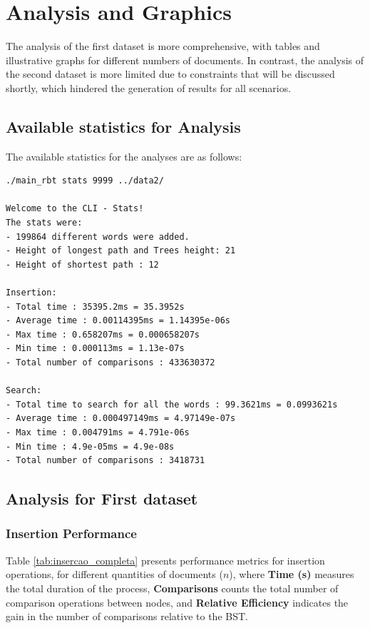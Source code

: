 \section{Analysis and Graphics}

The analysis of the first dataset is more comprehensive, with tables and illustrative graphs for different 
numbers of documents. In contrast, the analysis of the second dataset is more limited due to constraints that 
will be discussed shortly, which hindered the generation of results for all scenarios.

\subsection{Available statistics for Analysis}

The available statistics for the analyses are as follows:

\begin{verbatim}
./main_rbt stats 9999 ../data2/

Welcome to the CLI - Stats!
The stats were: 
- 199864 different words were added.
- Height of longest path and Trees height: 21
- Height of shortest path : 12

Insertion: 
- Total time : 35395.2ms = 35.3952s
- Average time : 0.00114395ms = 1.14395e-06s
- Max time : 0.658207ms = 0.000658207s
- Min time : 0.000113ms = 1.13e-07s
- Total number of comparisons : 433630372

Search: 
- Total time to search for all the words : 99.3621ms = 0.0993621s
- Average time : 0.000497149ms = 4.97149e-07s
- Max time : 0.004791ms = 4.791e-06s
- Min time : 4.9e-05ms = 4.9e-08s
- Total number of comparisons : 3418731

\end{verbatim}

\subsection{Analysis for First dataset}

 \subsubsection{Insertion Performance}

 Table \ref{tab:insercao_completa} presents performance metrics for insertion operations,
 for different quantities of documents ($n$), where \textbf{Time (s)} measures the total duration of the process, \textbf{Comparisons} counts the total number
 of comparison operations between nodes, and \textbf{Relative Efficiency} indicates the gain in the number of comparisons relative to the BST.

